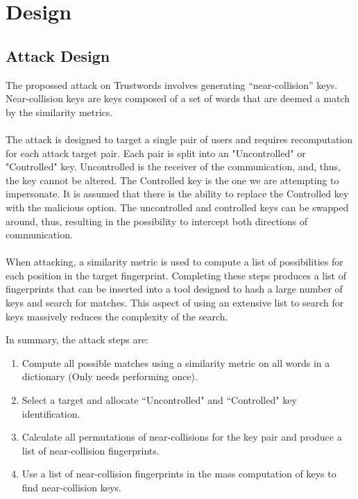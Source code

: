 \section{Design}

\subsection{Attack Design}
\label{sec:attackDesign}
The propossed attack on Trustwords involves generating ``near-collision'' keys. Near-collision keys are keys composed of a set of words that are deemed a match by the similarity metrics.
\\\\
The attack is designed to target a single pair of users and requires recomputation for each attack target pair. Each pair is split into an "Uncontrolled" or "Controlled" key. Uncontrolled is the receiver of the communication, and, thus, the key cannot be altered. The Controlled key is the one we are attempting to impersonate. It is assumed that there is the ability to replace the Controlled key with the malicious option. The uncontrolled and controlled keys can be swapped around, thus, resulting in the possibility to intercept both directions of communication.
\\\\
When attacking, a similarity metric is used to compute a list of possibilities for each position in the target fingerprint. Completing these steps produces a list of fingerprints that can be inserted into a tool designed to hash a large number of keys and search for matches. This aspect of using an extensive list to search for keys massively reduces the complexity of the search.

In summary, the attack steps are:
\begin{enumerate}
    \item Compute all possible matches using a similarity metric on all words in a dictionary (Only needs performing once).

    \item Select a target and allocate ``Uncontrolled" and ``Controlled" key identification.
    
    \item Calculate all permutations of near-collisions for the key pair and produce a list of near-collision fingerprints.
    
    \item Use a list of near-collision fingerprints in the mass computation of keys to find near-collision keys.

\end{enumerate}


